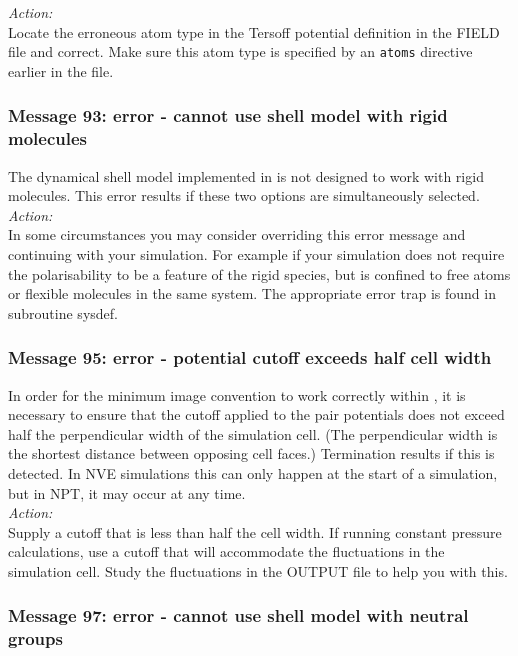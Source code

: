 \noindent
{\em Action:}\\
Locate the erroneous atom type in the Tersoff potential definition in
the FIELD file and correct. Make sure this atom type is specified by
an {\tt atoms} directive earlier in the file.

\subsubsection*{Message 93: error - cannot use shell model with rigid
molecules}

The dynamical shell model  implemented in \D{} is not designed
to work with rigid molecules. This error results if these two options
are simultaneously selected. \\

\noindent
{\em Action:} \\ 
In some circumstances you may consider overriding
this error message and continuing with your simulation.  For example
if your simulation does not require the polarisability to be a feature
of the rigid species, but is confined to free atoms or flexible
molecules in the same system. The appropriate error trap is found in
subroutine {\sc sysdef}.

\subsubsection*{Message 95: error - potential cutoff exceeds half cell width}

In order for the minimum image convention to work correctly within
\D{}, it is necessary to ensure that the cutoff applied to the
pair potentials does not exceed half the perpendicular width of the
simulation cell. (The perpendicular width is the shortest distance
between opposing cell faces.) Termination results if this is detected.
In NVE simulations this can only happen at the start of a simulation,
but in NPT, it may occur at any time. \\ 

\noindent
{\em Action:} \\ 
Supply a cutoff that is less than half the cell width. If running
constant pressure calculations, use a cutoff that will accommodate
the fluctuations in  the simulation cell. Study the fluctuations
in the OUTPUT file to help you with this.

\subsubsection*{Message 97: error - cannot use shell model with neutral
groups}

